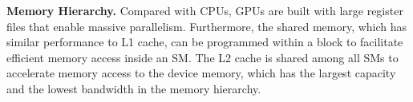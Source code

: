 \vspace{1mm}\noindent\textbf{Memory Hierarchy.} Compared with CPUs, GPUs are built with large register files that enable massive parallelism. 
Furthermore, the shared memory, which has similar performance to L1 cache, can be programmed within a block to facilitate efficient memory access inside an SM.
The L2 cache is shared among all SMs to accelerate memory access to the device memory, which has the largest capacity and the lowest bandwidth in the memory hierarchy.



